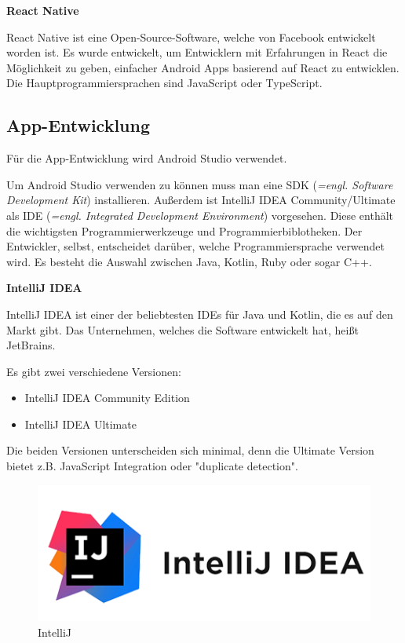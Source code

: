 \textbf{React Native}

React Native ist eine Open-Source-Software, welche von Facebook entwickelt worden ist. Es wurde entwickelt, um Entwicklern mit Erfahrungen in React die Möglichkeit zu geben, einfacher Android Apps basierend auf React zu entwicklen. Die Hauptprogrammiersprachen sind JavaScript oder TypeScript.

\cite{ReactNative}

\subsection{App-Entwicklung}

Für die App-Entwicklung wird Android Studio verwendet. 

Um Android Studio verwenden zu können muss man eine SDK (\emph{=engl. Software Development Kit}) installieren. Außerdem ist IntelliJ IDEA Community/Ultimate als IDE (\emph{=engl. Integrated Development Environment}) vorgesehen. Diese enthält die wichtigsten Programmierwerkzeuge und Programmierbiblotheken. Der Entwickler, selbst, entscheidet darüber, welche Programmiersprache verwendet wird. Es besteht die Auswahl zwischen Java, Kotlin, Ruby oder sogar C++.

\cite{AppEntwicklung}

\textbf{IntelliJ IDEA}

IntelliJ IDEA ist einer der beliebtesten IDEs für Java und Kotlin, die es auf den Markt gibt. Das Unternehmen, welches die Software entwickelt hat, heißt JetBrains. 

Es gibt zwei verschiedene Versionen:
\begin{itemize}
	\item IntelliJ IDEA Community Edition
	\item IntelliJ IDEA Ultimate
\end{itemize}

Die beiden Versionen unterscheiden sich minimal, denn die Ultimate Version bietet z.B. JavaScript Integration oder "duplicate detection".

\begin{figure}[H]
	\centering
	\includegraphics[width=0.5\linewidth]{images/intelliJ.png}
	\caption[IntelliJ]{IntelliJ}
	\label{fig:IntelliJ}
\end{figure}

